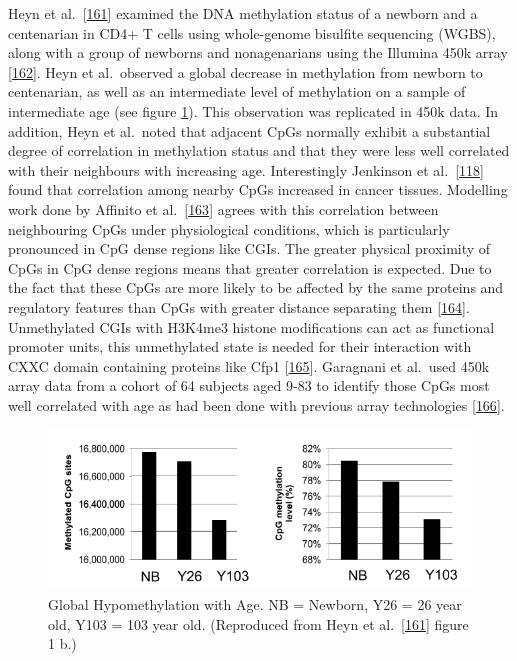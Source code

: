 \documentclass[
]{book}
\begin{document}
Heyn et al.~{[}\protect\hyperlink{ref-Heyn2012}{161}{]} examined the DNA methylation status of a newborn and a centenarian in CD4+ T cells using whole-genome bisulfite sequencing (WGBS), along with a group of newborns and nonagenarians using the Illumina 450k array {[}\protect\hyperlink{ref-Bibikova2011}{162}{]}.
Heyn et al.~observed a global decrease in methylation from newborn to centenarian, as well as an intermediate level of methylation on a sample of intermediate age (see figure \ref{fig:Heyn2012F1b}).
This observation was replicated in 450k data.
In addition, Heyn et al.~noted that adjacent CpGs normally exhibit a substantial degree of correlation in methylation status and that they were less well correlated with their neighbours with increasing age.
Interestingly Jenkinson et al.~{[}\protect\hyperlink{ref-Jenkinson2017}{118}{]} found that correlation among nearby CpGs increased in cancer tissues.
Modelling work done by Affinito et al.~{[}\protect\hyperlink{ref-Affinito2016}{163}{]} agrees with this correlation between neighbouring CpGs under physiological conditions, which is particularly pronounced in CpG dense regions like CGIs.
The greater physical proximity of CpGs in CpG dense regions means that greater correlation is expected.
Due to the fact that these CpGs are more likely to be affected by the same proteins and regulatory features than CpGs with greater distance separating them {[}\protect\hyperlink{ref-Haerter2014}{164}{]}.
Unmethylated CGIs with H3K4me3 histone modifications can act as functional promoter units, this unmethylated state is needed for their interaction with CXXC domain containing proteins like Cfp1 {[}\protect\hyperlink{ref-Thomson2010}{165}{]}.
Garagnani et al.~used 450k array data from a cohort of 64 subjects aged 9-83 to identify those CpGs most well correlated with age as had been done with previous array technologies {[}\protect\hyperlink{ref-Garagnani2012}{166}{]}.

\begin{figure}

{\centering \includegraphics[width=0.8\linewidth]{figs/Heyn2012F1b} 

}

\caption{Global Hypomethylation with Age. NB = Newborn, Y26 = 26 year old, Y103 = 103 year old.
(Reproduced from Heyn et al.~{[}\protect\hyperlink{ref-Heyn2012}{161}{]} figure 1 b.)}\label{fig:Heyn2012F1b}
\end{figure}
\end{document}
